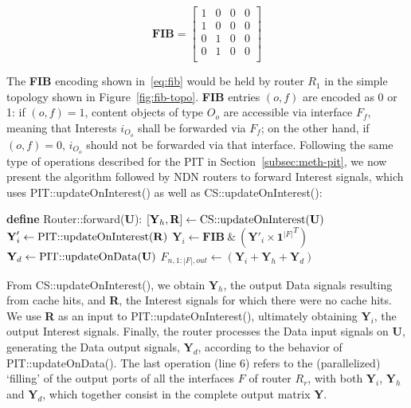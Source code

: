 \begin{equation}
\textbf{FIB} = \begin{bmatrix} 1 & 0 & 0 & 0  \\ 
                1 & 0 & 0 & 0               \\ 
                0 & 1 & 0 & 0               \\ 
                0 & 1 & 0 & 0               \\ \end{bmatrix}
    \label{eq:fib}
\end{equation}\shortvertbreak

The \textbf{FIB} encoding shown in~\ref{eq:fib} would be held by router $R_1$ in the 
simple topology shown in Figure~\ref{fig:fib-topo}. \textbf{FIB} entries 
$(o,f)$ are encoded as 0 or 1: if $(o,f) = 1$, content objects of 
type $O_o$ are accessible via interface $F_f$, meaning that Interests 
$i_{O_o}$ shall be forwarded via $F_f$; on the other hand, 
if $(o,f) = 0$, $i_{O_o}$ should not be forwarded via that interface. 
Following the same type of operations described for the PIT 
in Section~\ref{subsec:meth-pit}, we now present the algorithm followed by NDN 
routers to forward Interest signals, which uses PIT::updateOnInterest() as well 
as CS::updateOnInterest():\shortvertbreak 

\begin{algorithmic}[1]

\State \textbf{define} Router::forward($\textbf{U}$):
\State
    \State $[\textbf{Y}_h, \textbf{R}] \leftarrow \text{CS::updateOnInterest(\textbf{U})}$
    \State $\textbf{Y}'_i \leftarrow \text{PIT::updateOnInterest(\textbf{R})}$
    \State $\textbf{Y}_i \leftarrow \textbf{FIB} \ \& \ (\textbf{Y}'_i \times {\textbf{1}^{|F|}}^{T})$
    \State $\textbf{Y}_d \leftarrow \text{PIT::updateOnData(\textbf{U})}$
    \State $F_{n,1:|F|,out} \leftarrow (\textbf{Y}_i + \textbf{Y}_h + \textbf{Y}_d)$

\end{algorithmic}\shortvertbreak

From CS::updateOnInterest(), we obtain $\textbf{Y}_h$, the output Data signals 
resulting from cache hits, and \textbf{R}, the Interest signals for which 
there were no cache hits. We use \textbf{R} as an input to PIT::updateOnInterest(), 
ultimately obtaining $\textbf{Y}_i$, the output Interest signals. Finally, 
the router processes the Data input signals on \textbf{U}, generating the 
Data output signals, $\textbf{Y}_d$, according to the behavior of 
PIT::updateOnData(). The last 
operation (line 6) refers to 
the (parallelized) `filling' of the output ports of all the interfaces $F$ of router $R_r$, 
with both $\textbf{Y}_i$, $\textbf{Y}_h$ and $\textbf{Y}_d$, which together 
consist in the complete output matrix \textbf{Y}.\shortvertbreak

